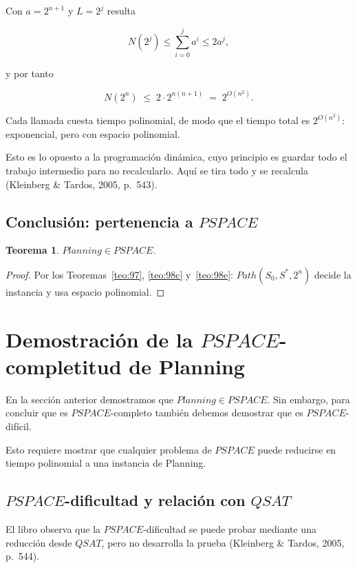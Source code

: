 \documentclass[11pt,letterpaper]{article}
\theoremstyle{plain}
\newtheorem{teorema}{Teorema}[section]
\theoremstyle{definition}
\theoremstyle{remark}
\newcommand{\nombreMat}[1]{\ensuremath{\text{\fontencoding{OT1}\fontfamily{cmss}\upshape\selectfont #1}}}
\newcommand{\PSPACE}{\nombreMat{PSPACE}}
\newcommand{\NP}{\nombreMat{NP}}
\newcommand{\coNP}{\nombreMat{co-NP}}
\newcommand{\QSAT}{\nombreMat{QSAT}}
\newcommand{\PLANNING}{\nombreMat{Planning}}
\newcommand{\Path}{\nombreMat{Path}}
\def\PSPACE{PSPACE}\def\NP{NP}\def\coNP{co-NP}%
\def\QSAT{QSAT}\def\PLANNING{Planning}\def\Path{Path}%
\begin{document}
Con $a=2^{n+1}$ y $L=2^{j}$ resulta

\[
N(2^{j})\le\sum_{i=0}^{j}a^{i}\le 2a^{j},
\]

y por tanto

\[
N(2^{n})\;\le\;2\cdot 2^{n(n+1)}
\;=\;2^{O(n^{2})}.
\]

Cada llamada cuesta tiempo polinomial, de modo
que el tiempo total es $2^{O(n^{2})}$:
exponencial, pero con espacio polinomial.

Esto es lo opuesto a la programación dinámica,
cuyo principio es guardar todo el trabajo
intermedio para no recalcularlo. Aquí se tira
todo y se recalcula
(Kleinberg \& Tardos, 2005, p.~543).

\subsection{Conclusión: pertenencia a $\PSPACE$}

\begin{teorema}\label{teo:planningPSPACE}
$\PLANNING\in\PSPACE$.
\end{teorema}

\begin{proof}
Por los Teoremas~\ref{teo:97},
\ref{teo:98c} y~\ref{teo:98e}:
$\Path(S_0,S^{*},2^{n})$ decide la
instancia y usa espacio polinomial.
\end{proof}




\newpage
\section{Demostración de la $\PSPACE$-completitud de
\PLANNING{}}\label{sec:completitud}


En la sección anterior demostramos que
$\PLANNING\in\PSPACE$. Sin embargo, para concluir
que es $\PSPACE$-completo también debemos
demostrar que es $\PSPACE$-difícil.

Esto requiere mostrar que cualquier problema
de $\PSPACE$ puede reducirse en tiempo polinomial
a una instancia de \PLANNING{}.


\subsection{$\PSPACE$-dificultad y relación con $\QSAT$}

El libro observa que la $\PSPACE$-dificultad
se puede probar mediante
una reducción desde $\QSAT$, pero no desarrolla
la prueba (Kleinberg \& Tardos, 2005, p.~544).
\end{document}
